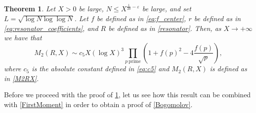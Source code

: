 \documentclass[10pt,a4paper]{amsart}
\theoremstyle{plain}
\newtheorem{theorem}{Theorem}[section]
\theoremstyle{definition}
\theoremstyle{remark}
\begin{document}
\begin{theorem}\label{SecondMoment}
Let $X > 0$ be large, $N\leq X^{\frac{1}{20}-\varepsilon}$ be large, and set $L=\sqrt{\log N\log\log N}$. Let $f$ be defined as in \eqref{eq:f_center}, $r$ be defined as in \eqref{eq:resonator_coefficients}, and $R$ be defined as in \eqref{resonator}. Then, as $X \to +\infty$ we have that
\begin{equation}
M_2(R,X)\sim c_5 X(\log X)^3\prod_{p \ \text{prime}}\left(1+f(p)^2-4\frac{f(p)}{\sqrt{p}}\right),
\end{equation}
where $c_5$ is the absolute constant defined in \eqref{eq:c5} and $M_2(R,X)$ is defined as in \eqref{M2RX}.
\end{theorem}

Before we proceed with the proof of \cref{SecondMoment}, let us see how this result can be combined with \cref{FirstMoment} in order to obtain a proof of \cref{Bogomolov}.
\end{document}
